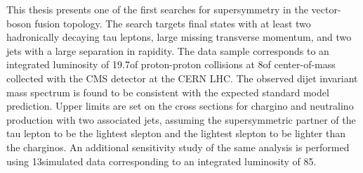 This thesis presents one of the first searches for supersymmetry in the vector-boson fusion topology. The search targets final states with at least two hadronically decaying tau leptons, large missing transverse momentum, and two jets with a large separation in rapidity. The data sample corresponds to an integrated luminosity of 19.7\invfb of proton-proton collisions at 8\tev of center-of-mass collected with the CMS detector at the CERN LHC. The observed dijet invariant mass spectrum is found to be consistent with the expected standard model prediction. Upper limits are set on the cross sections for chargino and neutralino production with two associated jets, assuming the supersymmetric partner of the tau lepton to be the lightest slepton and the lightest slepton to be lighter than the charginos. An additional sensitivity study of the same analysis is performed using 13\tev simulated data corresponding to an integrated luminosity of 85\invfb. 